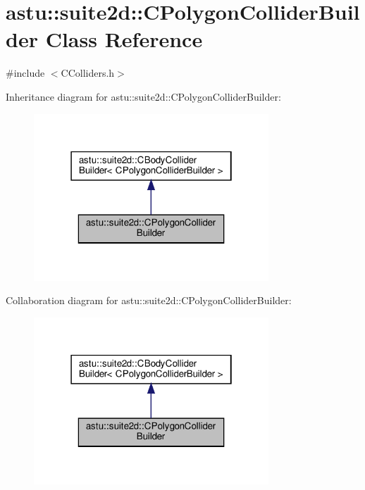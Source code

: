\hypertarget{classastu_1_1suite2d_1_1CPolygonColliderBuilder}{}\section{astu\+:\+:suite2d\+:\+:C\+Polygon\+Collider\+Builder Class Reference}
\label{classastu_1_1suite2d_1_1CPolygonColliderBuilder}


{\ttfamily \#include $<$C\+Colliders.\+h$>$}



Inheritance diagram for astu\+:\+:suite2d\+:\+:C\+Polygon\+Collider\+Builder\+:\nopagebreak
\begin{figure}[H]
\begin{center}
\leavevmode
\includegraphics[width=250pt]{classastu_1_1suite2d_1_1CPolygonColliderBuilder__inherit__graph}
\end{center}
\end{figure}


Collaboration diagram for astu\+:\+:suite2d\+:\+:C\+Polygon\+Collider\+Builder\+:\nopagebreak
\begin{figure}[H]
\begin{center}
\leavevmode
\includegraphics[width=250pt]{classastu_1_1suite2d_1_1CPolygonColliderBuilder__coll__graph}
\end{center}
\end{figure}
